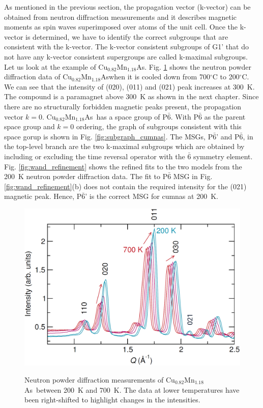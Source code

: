 \documentclass[10pt,doublespacing,edeposit]{uiucthesis2020}
\newcommand*{\cumnas}{Cu$_{0.82}$Mn$_{1.18}$As}
\begin{document}
\begin{mainmatter}

As mentioned in the previous section, the propagation vector (k-vector) can be obtained from neutron diffraction measurements and it describes magnetic moments as spin waves superimposed over atoms of the unit cell. Once the k-vector is determined, we have to identify the correct subgroups that are consistent with the k-vector. The k-vector consistent subgroups of G1' that do not have any k-vector consistent supergroups are called k-maximal subgroups. Let us look at the example of \cumnas. Fig. \ref{fig:WAND_data} shows the neutron powder diffraction data of \cumnas when it is cooled down from 700$^\circ$C to 200$^\circ$C. We can see that the intensity of (020), (011) and (021) peak increases at 300~K. The compound is a paramagnet above 300~K as shown in the next chapter. Since there are no structurally forbidden magnetic peaks present, the propagation vector $k = 0$. \cumnas\ has a space group of P$\bar{6}$. With P$\bar{6}$ as the parent space group and $k = 0$ ordering, the graph of subgroups consistent with this space gorup is shown in Fig. \ref{fig:subgraph_cumnas}. The MSGs, P$\bar{6}$' and P$\bar{6}$, in the top-level branch are the two k-maximal subgroups which are obtained by including or excluding the time reversal operator with the $\bar{6}$ symmetry element. Fig. \ref{fig:wand_refinement} shows the refined fits to the two models from the 200~K neutron powder diffraction data. The fit to P$\bar{6}$ MSG in Fig. \ref{fig:wand_refinement}(b) does not contain the required intensity for the (021) magnetic peak. Hence, P$\bar{6}$' is the correct MSG for cumnas at 200~K.

\begin{figure}
\centering\includegraphics[width=0.7\columnwidth]{figures/ch4/WAND_data.png} \\
\caption{\label{fig:WAND_data}
Neutron powder diffraction measurements of \cumnas\ between 200~K and 700~K. The data at lower temperatures have been right-shifted to highlight changes in the intensities.
}
\end{figure}



\end{mainmatter}
\end{document}
